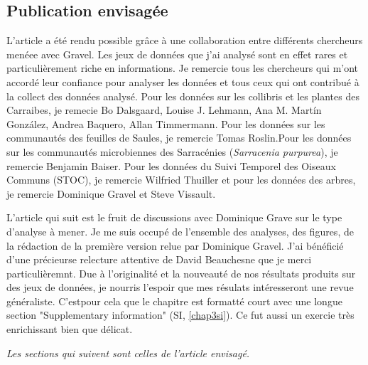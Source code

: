 \subsection{Publication envisagée}


L'article a été rendu possible grâce à une collaboration entre différents
chercheurs menéee avec Gravel. Les jeux de données que j'ai analysé
sont en effet rares et particulièrement riche en informations.
Je remercie tous les chercheurs qui m'ont accordé leur confiance
pour analyser les données et tous ceux qui ont contribué à la collect des données
analysé. Pour les données sur les collibris et les plantes des Carraibes,
je remecie Bo Dalsgaard, Louise J. Lehmann, Ana M. Martín González,
Andrea Baquero, Allan Timmermann. Pour les données sur les communautés des feuilles de Saules,
je remercie Tomas Roslin.Pour les données sur les communautés microbiennes des
Sarracénies (\emph{Sarracenia purpurea}), je remercie Benjamin Baiser.
Pour les données du Suivi Temporel des Oiseaux Communs (STOC), je remercie Wilfried Thuiller
et pour les données des arbres, je remercie Dominique Gravel et Steve Vissault.

L'article qui suit est le fruit de discussions avec Dominique Grave sur le type
d'analyse à mener. Je me suis occupé de l'ensemble des analyses, des figures,
de la rédaction de la première version relue par Dominique Gravel. J'ai
bénéficié d'une précieurse relecture attentive de David Beauchesne que je
merci particulièremnt. Due à l'originalité et la nouveauté de nos résultats
produits sur des jeux de données, je nourris l'espoir que mes résulats intéresseront
une revue généraliste. C'estpour cela que le chapitre est formatté court avec une
longue section "Supplementary information" (SI, \ref{chap3si}). Ce fut aussi
un exercie très enrichissant bien que délicat. 


\emph{Les sections qui suivent sont celles de l'article envisagé.}


\newpage
